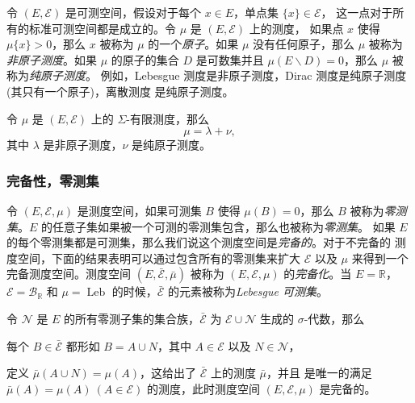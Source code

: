 \documentclass[fontset=none]{Notes}
\DeclareMathOperator\Leb{Leb}
\begin{document}
令 $(E,\mathcal{E})$ 是可测空间，假设对于每个 $x\in E$，单点集 $\{x\}\in \mathcal{E}$，
这一点对于所有的标准可测空间都是成立的。令 $\mu$ 是 $(E,\mathcal{E})$ 上的测度，
如果点 $x$ 使得 $\mu\{x\}>0$，那么 $x$ 被称为 $\mu$ 的一个\emph{原子}。如果 $\mu$
没有任何原子，那么 $\mu$ 被称为\emph{非原子测度}。如果 $\mu$ 的原子的集合 $D$
是可数集并且 $\mu(E \smallsetminus D)=0$，那么 $\mu$ 被称为\emph{纯原子测度}。
例如，Lebesgue 测度是非原子测度，Dirac 测度是纯原子测度(其只有一个原子)，离散测度
是纯原子测度。

\begin{proposition}
  令 $\mu$ 是 $(E,\mathcal{E})$ 上的 $\Sigma$-有限测度，那么
  \[
    \mu=\lambda+\nu,
  \]
  其中 $\lambda$ 是非原子测度，$\nu$ 是纯原子测度。
\end{proposition}


\subsubsection{完备性，零测集}

令 $(E,\mathcal{E},\mu)$ 是测度空间，如果可测集 $B$ 使得 $\mu(B)=0$，那么 $B$
被称为\emph{零测集}。$E$ 的任意子集如果被一个可测的零测集包含，那么也被称为\emph{零测集}。
如果 $E$ 的每个零测集都是可测集，那么我们说这个测度空间是\emph{完备的}。对于不完备的
测度空间，下面的结果表明可以通过包含所有的零测集来扩大 $\mathcal{E}$ 以及
$\mu$ 来得到一个完备测度空间。测度空间 $(E,\bar{\mathcal{E}},\bar\mu)$ 被称为
$(E,\mathcal{E},\mu)$ 的\emph{完备化}。当 $E=\mathbb{R}$，$\mathcal{E}=\mathcal{B}_{\mathbb{R}}$
和 $\mu=\Leb$ 的时候，$\bar{\mathcal{E}}$ 的元素被称为\emph{Lebesgue 可测集}。

\begin{proposition}
  令 $\mathcal{N}$ 是 $E$ 的所有零测子集的集合族，$\bar{\mathcal{E}}$ 为 $\mathcal{E}\cup \mathcal{N}$
  生成的 $\sigma$-代数，那么
  \begin{alphenum}[nosep]
    \item 每个 $B\in\bar{\mathcal{E}}$ 都形如 $B=A\cup N$，其中 $A\in \mathcal{E}$ 以及 $N\in \mathcal{N}$，
    \item 定义 $\bar\mu(A\cup N)=\mu(A)$，这给出了 $\bar{\mathcal{E}}$ 上的测度 $\bar\mu$，并且
    是唯一的满足 $\bar\mu(A)=\mu(A)\ (A\in \mathcal{E})$ 的测度，此时测度空间 $(E,\mathcal{E},\mu)$
    是完备的。
  \end{alphenum}
\end{proposition}
\end{document}

